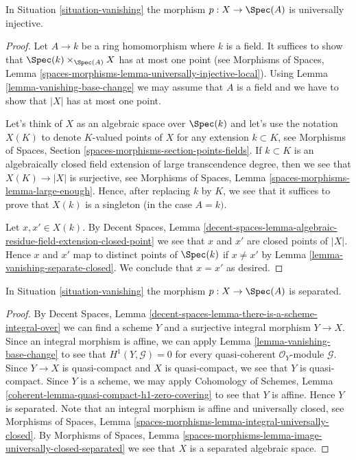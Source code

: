 \begin{lemma}
\label{lemma-vanishing-injective}
In Situation \ref{situation-vanishing} the morphism $p : X \to \Spec(A)$ is
universally injective.
\end{lemma}

\begin{proof}
Let $A \to k$ be a ring homomorphism where $k$ is a field. It suffices to
show that $\Spec(k) \times_{\Spec(A)} X$ has at most one point (see
Morphisms of Spaces, Lemma
\ref{spaces-morphisms-lemma-universally-injective-local}).
Using Lemma \ref{lemma-vanishing-base-change} we may assume that $A$
is a field and we have to show that $|X|$ has at most one point.

\medskip\noindent
Let's think of $X$ as an algebraic space over $\Spec(k)$ and let's
use the notation $X(K)$ to denote $K$-valued points of $X$
for any extension $k \subset K$, see
Morphisms of Spaces, Section \ref{spaces-morphisms-section-points-fields}.
If $k \subset K$ is an algebraically closed field extension
of large transcendence degree, then we see that $X(K) \to |X|$
is surjective, see Morphisms of Spaces, Lemma
\ref{spaces-morphisms-lemma-large-enough}. Hence, after replacing $k$
by $K$, we see that it suffices to prove that $X(k)$ is a singleton
(in the case $A = k)$.

\medskip\noindent
Let $x, x' \in X(k)$. By Decent Spaces, Lemma
\ref{decent-spaces-lemma-algebraic-residue-field-extension-closed-point}
we see that $x$ and $x'$ are closed points of $|X|$. Hence $x$ and $x'$
map to distinct points of $\Spec(k)$ if $x \not = x'$ by
Lemma \ref{lemma-vanishing-separate-closed}. We conclude that
$x = x'$ as desired.
\end{proof}

\begin{lemma}
\label{lemma-vanishing-separated}
In Situation \ref{situation-vanishing} the morphism $p : X \to \Spec(A)$ is
separated.
\end{lemma}

\begin{proof}
By Decent Spaces, Lemma
\ref{decent-spaces-lemma-there-is-a-scheme-integral-over}
we can find a scheme $Y$ and a surjective integral morphism
$Y \to X$. Since an integral morphism is affine, we can apply
Lemma \ref{lemma-vanishing-base-change}
to see that $H^1(Y, \mathcal{G}) = 0$ for every
quasi-coherent $\mathcal{O}_Y$-module $\mathcal{G}$.
Since $Y \to X$ is quasi-compact and $X$ is quasi-compact,
we see that $Y$ is quasi-compact.
Since $Y$ is a scheme, we may apply
Cohomology of Schemes, Lemma
\ref{coherent-lemma-quasi-compact-h1-zero-covering}
to see that $Y$ is affine. Hence $Y$ is separated.
Note that an integral morphism is affine and universally closed, see
Morphisms of Spaces, Lemma
\ref{spaces-morphisms-lemma-integral-universally-closed}.
By Morphisms of Spaces, Lemma
\ref{spaces-morphisms-lemma-image-universally-closed-separated}
we see that $X$ is a separated algebraic space.
\end{proof}

